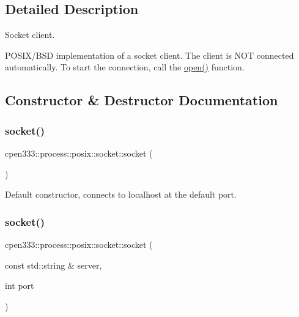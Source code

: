 \subsection{Detailed Description}
Socket client. 

P\+O\+S\+I\+X/\+B\+SD implementation of a socket client. The client is N\+OT connected automatically. To start the connection, call the \hyperlink{classcpen333_1_1process_1_1posix_1_1socket_a0ac2e0452989cca9e6279602a8d73854}{open()} function. 

\subsection{Constructor \& Destructor Documentation}
\mbox{\label{classcpen333_1_1process_1_1posix_1_1socket_a37b973439d588e1a3b3f43381e9fef55}} 
\subsubsection{\texorpdfstring{socket()}{socket()}\hspace{0.1cm}{\footnotesize\ttfamily [1/3]}}
{\footnotesize\ttfamily cpen333\+::process\+::posix\+::socket\+::socket (\begin{DoxyParamCaption}{ }\end{DoxyParamCaption})\hspace{0.3cm}{\ttfamily [inline]}}



Default constructor, connects to localhost at the default port. 

\mbox{\label{classcpen333_1_1process_1_1posix_1_1socket_a0cb25f1ab47ee533f8c5a9b8968357bd}} 
\subsubsection{\texorpdfstring{socket()}{socket()}\hspace{0.1cm}{\footnotesize\ttfamily [2/3]}}
{\footnotesize\ttfamily cpen333\+::process\+::posix\+::socket\+::socket (\begin{DoxyParamCaption}\item[{const std\+::string \&}]{server,  }\item[{int}]{port }\end{DoxyParamCaption})\hspace{0.3cm}{\ttfamily [inline]}}



